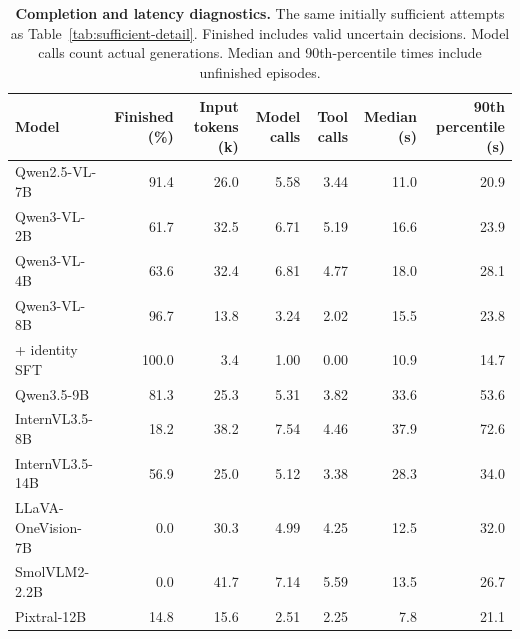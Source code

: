 \begin{table}[t]
\centering\small
\caption{\textbf{Completion and latency diagnostics.}
The same initially sufficient attempts as Table~\ref{tab:sufficient-detail}. Finished includes valid uncertain decisions.
Model calls count actual generations. Median and 90th-percentile times include unfinished episodes.}
\label{tab:efficiency-reference}
\begin{tabular}{@{}lrrrrrr@{}}
\toprule
Model & Finished (\%) & Input tokens (k) & Model calls & Tool calls & Median (s) & 90th percentile (s)\\
\midrule
Qwen2.5-VL-7B & 91.4 & 26.0 & 5.58 & 3.44 & 11.0 & 20.9\\
Qwen3-VL-2B & 61.7 & 32.5 & 6.71 & 5.19 & 16.6 & 23.9\\
Qwen3-VL-4B & 63.6 & 32.4 & 6.81 & 4.77 & 18.0 & 28.1\\
Qwen3-VL-8B & 96.7 & 13.8 & 3.24 & 2.02 & 15.5 & 23.8\\
\quad + identity SFT & 100.0 & 3.4 & 1.00 & 0.00 & 10.9 & 14.7\\
Qwen3.5-9B & 81.3 & 25.3 & 5.31 & 3.82 & 33.6 & 53.6\\
InternVL3.5-8B & 18.2 & 38.2 & 7.54 & 4.46 & 37.9 & 72.6\\
InternVL3.5-14B & 56.9 & 25.0 & 5.12 & 3.38 & 28.3 & 34.0\\
LLaVA-OneVision-7B & 0.0 & 30.3 & 4.99 & 4.25 & 12.5 & 32.0\\
SmolVLM2-2.2B & 0.0 & 41.7 & 7.14 & 5.59 & 13.5 & 26.7\\
Pixtral-12B & 14.8 & 15.6 & 2.51 & 2.25 & 7.8 & 21.1\\
\bottomrule
\end{tabular}
\end{table}
